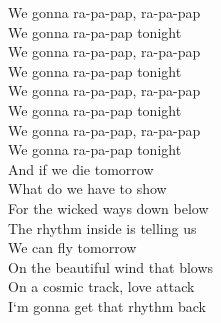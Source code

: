 \documentclass{novel}
\begin{document}
\begin{multicols}{2}
We gonna ra-pa-pap, ra-pa-pap \\
We gonna ra-pa-pap tonight \\

We gonna ra-pa-pap, ra-pa-pap \\
We gonna ra-pa-pap tonight \\

We gonna ra-pa-pap, ra-pa-pap \\
We gonna ra-pa-pap tonight \\

We gonna ra-pa-pap, ra-pa-pap \\
We gonna ra-pa-pap tonight \\

And if we die tomorrow \\
What do we have to show \\
For the wicked ways down below \\
The rhythm inside is telling us \\
We can fly tomorrow \\
On the beautiful wind that blows \\
On a cosmic track, love attack \\

I‘m gonna get that rhythm back
\end{multicols}
\end{document}

